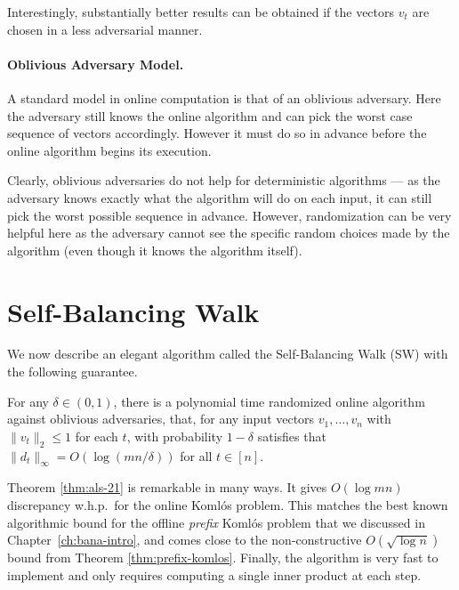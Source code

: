 Interestingly, substantially better results can be obtained if the vectors $v_t$ are chosen in a less adversarial manner.

\paragraph{Oblivious Adversary Model.} 
A standard model in online computation is that of an oblivious adversary. Here the adversary still knows the online algorithm and can pick the worst case sequence of vectors accordingly. However it must do so in advance before the online algorithm begins its execution. 

Clearly, oblivious adversaries do not help for deterministic
algorithms --- as the adversary knows exactly what the algorithm will do on each input, it can still pick the worst possible sequence in advance.
However, randomization can be very helpful here as the adversary cannot see the specific random choices made by the algorithm (even though it knows the algorithm itself).



\section{Self-Balancing Walk}
\label{sec:sw-alg}
We now describe an elegant algorithm called the  Self-Balancing Walk (SW) with the following guarantee.

\begin{theorem}
\label{thm:als-21} 
For any
$\delta \in (0,1)$, there is a polynomial time randomized online algorithm against oblivious
adversaries, that, for any input vectors $v_1, \ldots, v_n$ with
$\|v_t\|_2 \le 1$ for each $t$,  with probability $1-\delta$ satisfies that $\|d_t
\|_\infty =O(\log(mn/\delta))$ for all $t \in [n]$.
\end{theorem} 


Theorem \ref{thm:als-21} is remarkable in many ways. 
It gives $O(\log mn)$ discrepancy w.h.p.~for the online Koml\'{o}s
problem. This matches the best known algorithmic bound for the offline
\emph{prefix} Koml\'os problem that we discussed in
Chapter~\ref{ch:bana-intro}, and comes close to the non-constructive
$O(\sqrt{\log n})$ bound from  Theorem \ref{thm:prefix-komlos}.
Finally, the algorithm is very fast to implement and only requires computing a single inner product at each step. 

